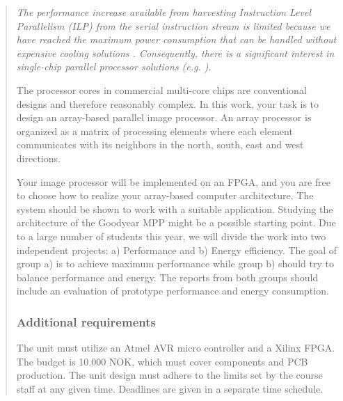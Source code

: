 \begin{quotation}\em
The performance increase available from harvesting Instruction Level Parallelism
(ILP) from the serial instruction stream is limited because we have reached the
maximum power consumption that can be handled without expensive cooling
solutions \cite{olukotun2005future}. Consequently, there is a significant
interest in single-chip parallel processor solutions (e.g. \cite{bell2008tile64,
  kongetira2005niagara}).

The processor cores in commercial multi-core chips are conventional designs and
therefore reasonably complex. In this work, your task is to design an
array-based parallel image processor. An array processor is organized as a
matrix of processing elements where each element communicates with its neighbors
in the north, south, east and west directions.

Your image processor will be implemented on an FPGA, and you are free to choose
how to realize your array-based computer architecture. The system should be
shown to work with a suitable application. Studying the architecture of the
Goodyear MPP \cite{batcher1980design,wiki:goodyear} might be a possible starting
point.  Due to a large number of students this year, we will divide the work
into two independent projects: a) Performance and b) Energy efficiency. The goal
of group a) is to achieve maximum performance while group b) should try to
balance performance and energy. The reports from both groups should include an
evaluation of prototype performance and energy consumption.

\subsubsection*{Additional requirements}
The unit must utilize an Atmel AVR micro controller and a Xilinx FPGA. The
budget is 10.000 NOK, which must cover components and PCB production. The unit
design must adhere to the limits set by the course staff at any given
time. Deadlines are given in a separate time schedule.
\end{quotation}

